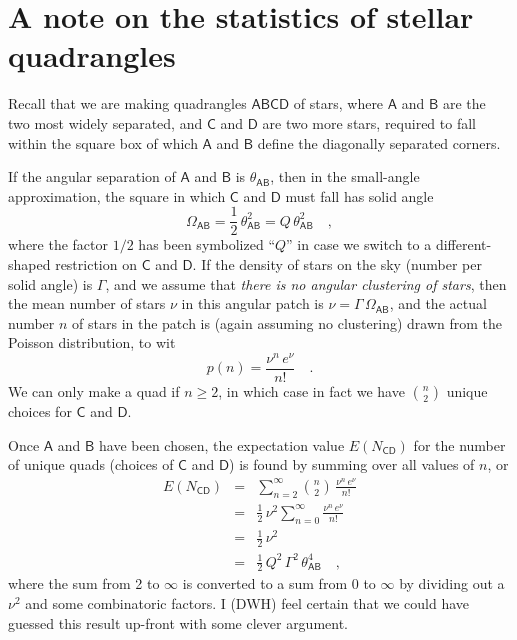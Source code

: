 \documentclass[letterpaper]{article}
\newcommand{\starlabel}[1]{\mathsf{#1}}
\newcommand{\AAA}{\starlabel{A}}
\newcommand{\BBB}{\starlabel{B}}
\newcommand{\CCC}{\starlabel{C}}
\newcommand{\DDD}{\starlabel{D}}
\newcommand{\thetaAB}{\theta_{\AAA\BBB}}
\newcommand{\OmegaAB}{\Omega_{\AAA\BBB}}
\newcommand{\ENCD}{E(N_{\CCC\DDD})}
\begin{document}
\section{A note on the statistics of stellar quadrangles}

Recall that we are making quadrangles $\AAA\BBB\CCC\DDD$ of stars,
where $\AAA$ and $\BBB$ are the two most widely separated, and $\CCC$
and $\DDD$ are two more stars, required to fall within the square box
of which $\AAA$ and $\BBB$ define the diagonally separated corners.

If the angular separation of $\AAA$ and $\BBB$ is $\thetaAB$, then in
the small-angle approximation, the square in which $\CCC$ and $\DDD$
must fall has solid angle
\begin{equation}
\OmegaAB = \frac{1}{2}\,\thetaAB^2 = Q\,\thetaAB^2 \quad ,
\end{equation}
where the factor $1/2$ has been symbolized ``$Q$'' in case we switch
to a different-shaped restriction on $\CCC$ and $\DDD$.  If the
density of stars on the sky (number per solid angle) is $\Gamma$, and
we assume that \emph{there is no angular clustering of stars}, then
the mean number of stars $\nu$ in this angular patch is
$\nu=\Gamma\,\OmegaAB$, and the actual number $n$ of stars in the
patch is (again assuming no clustering) drawn from the Poisson
distribution, to wit
\begin{equation}
p(n) = \frac{\nu^n\,e^{\nu}}{n!} \quad .
\end{equation}
We can only make a quad if $n\geq2$, in which case in fact we have
${n\choose 2}$ unique choices for $\CCC$ and $\DDD$.

Once $\AAA$ and $\BBB$ have been chosen, the expectation value $\ENCD$
for the number of unique quads (choices of $\CCC$ and $\DDD$) is found
by summing over all values of $n$, or
\begin{eqnarray}\displaystyle
\ENCD & = & \sum_{n=2}^{\infty} {n\choose 2}\,
              \frac{\nu^n\,e^{\nu}}{n!} \\
      & = & \frac{1}{2}\,\nu^2 \sum_{n=0}^{\infty} 
              \frac{\nu^n\,e^{\nu}}{n!} \\
      & = & \frac{1}{2}\,\nu^2 \\
      & = & \frac{1}{2}\,Q^2\,\Gamma^2\,\thetaAB^4 \quad ,
\end{eqnarray}
where the sum from 2 to $\infty$ is converted to a sum from 0 to
$\infty$ by dividing out a $\nu^2$ and some combinatoric factors.  I
(DWH) feel certain that we could have guessed this result up-front
with some clever argument.
\end{document}
